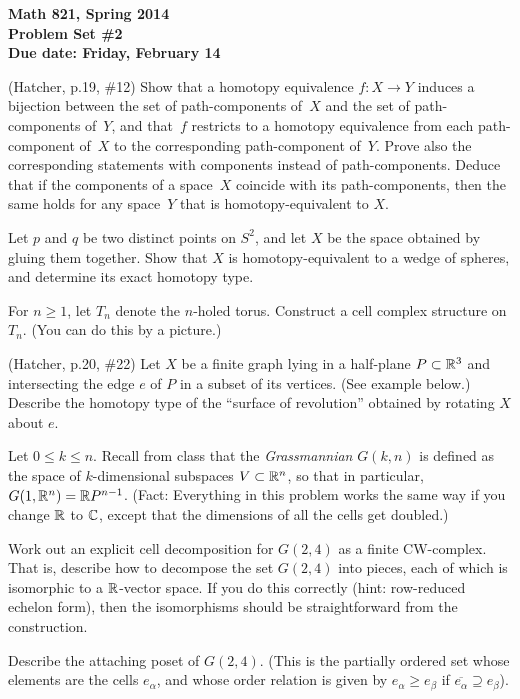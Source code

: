 
\usepackage{youngtab}

\thispagestyle{empty}
{\bf Math 821, Spring 2014\\
Problem Set \#2\\
Due date: Friday, February 14}

\prob (Hatcher, p.19, \#12)
Show that a homotopy equivalence $f:X\to Y$ induces a bijection 
between the set of path-components of~$X$ and the set of path-components 
of~$Y$, and that~$f$ restricts to a homotopy equivalence from each 
path-component of~$X$ to the corresponding path-component of~$Y$. Prove 
also the corresponding statements with components instead of 
path-components. Deduce that if the components of a space~$X$ coincide 
with its path-components, then the same holds for any space~$Y$ that is homotopy-equivalent to $X$.

\prob Let $p$ and $q$ be two distinct points on $S^2$, and let $X$ be the space obtained by gluing
them together.  Show that $X$ is homotopy-equivalent to a wedge of spheres, and determine its exact homotopy type.

\prob For $n\geq 1$, let $T_n$ denote the $n$-holed torus.  Construct a cell complex structure on $T_n$.  (You can do this by a picture.)

\prob (Hatcher, p.20, \#22) Let $X$ be a finite graph lying in a half-plane $P\subset\mathbb{R}^3$ and intersecting the
edge $e$ of $P$ in a subset of its vertices.  (See example below.)  Describe the homotopy type of the ``surface of revolution''
obtained by rotating $X$ about $e$.


\pagebreak

\prob Let $0\leq k\leq n$.
Recall from class that the \emph{Grassmannian} $G(k,n)$
is defined as the space of $k$-dimensional subspaces $V\subset\mathbb{R}^n$,
so that in particular, $G(1,\mathbb{R}^n)=\mathbb{R} P^{n-1}$.  (Fact: Everything in
this problem works the same way if you change $\mathbb{R}$ to $\mathbb{C}$, except
that the dimensions of all the cells get doubled.)

\probpart Work out an explicit cell decomposition for $G(2,4)$
as a finite CW-complex.  That is,
describe how to decompose the set $G(2,4)$ into pieces, each of which is
isomorphic to a $\mathbb{R}$-vector space.
If you do this correctly (hint: row-reduced echelon form),
then the isomorphisms should be straightforward from the construction.

\probpart Describe the attaching poset of $G(2,4)$.  (This
is the partially ordered
set whose elements are the cells $e_\alpha$, and whose order
relation is given by $e_\alpha\geq e_\beta$ if
$\overline{e_\alpha}\supseteq e_\beta$).

